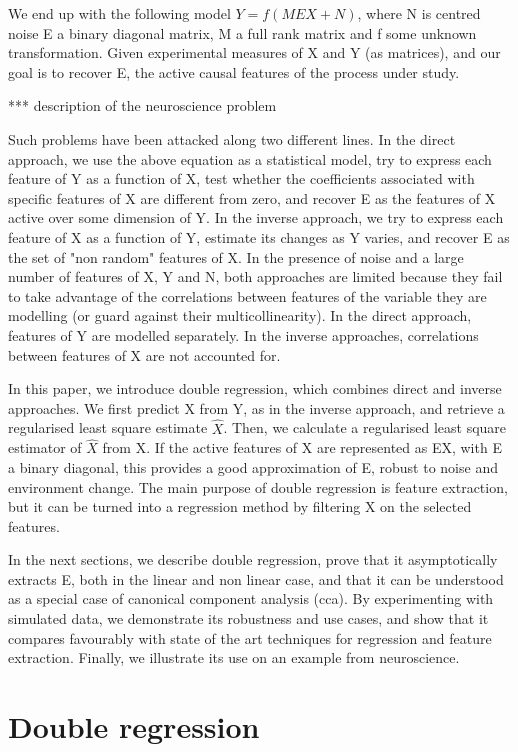 \documentclass{article}
\begin{document}
We end up with the following model $Y=f(MEX+N)$, where N is centred noise E a binary diagonal matrix, M a full rank matrix and f some unknown transformation.
%
Given experimental measures of X and Y (as matrices), and our goal is to recover E, the active causal features of the process under study.

*** description of the neuroscience problem

Such problems have been attacked along two different lines.
%
In the direct approach, we use the above equation as a statistical model, try to express each feature of Y as a function of X, test whether the coefficients associated with specific features of X are different from zero, and recover E as the features of X active over some dimension of Y.
%
In the inverse approach, we try to express each feature of X as a function of Y, estimate its changes as Y varies, and recover E as the set of "non random" features of X.
%
In the presence of noise and a large number of features of X, Y and N, both approaches are limited because they fail to take advantage of the correlations between features of the variable they are modelling (or guard against their multicollinearity).
%
In the direct approach, features of Y are modelled separately.
%
In the inverse approaches, correlations between features of X are not accounted for.

In this paper, we introduce double regression, which combines direct and inverse approaches.
%
We first predict X from Y, as in the inverse approach, and retrieve a regularised least square estimate $\hat X$.
%
Then, we calculate a regularised least square estimator of $\hat X$ from X.
%
If the active features of X are represented as EX, with E a binary diagonal, this provides a good approximation of E, robust to noise and environment change.
%
The main purpose of double regression is feature extraction, but it can be turned into a regression method by filtering X on the selected features.

In the next sections, we describe double regression, prove that it asymptotically extracts E, both in the linear and non linear case, and that it can be understood as a special case of canonical component analysis (cca).
%
By experimenting with simulated data, we demonstrate its robustness and use cases, and show that it compares favourably with state of the art techniques for regression and feature extraction.
%
Finally, we illustrate its use on an example from neuroscience.

\section{Double regression}
\end{document}
